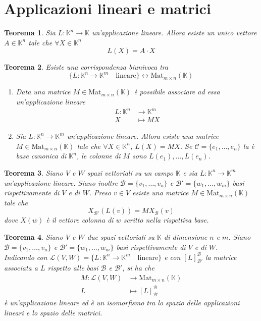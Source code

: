 \documentclass[9pt, a4paper]{article}
\newcommand{\K}{\mathbb{K}}
\theoremstyle{mythm}
\newtheorem{thm}{Teorema}[section]
\begin{document}
\clearpage

\section{Applicazioni lineari e matrici}

\begin{thm}
	Sia $ L \colon \K^n \to \K $ un'applicazione lineare. Allora esiste un unico vettore $ A \in \K^n $ tale che $ \forall X \in \K^n $ \[L(X) = A \cdot X\]
\end{thm}

\begin{thm}
	Esiste una corrispondenza biunivoca tra \[\{L \colon \K^n \to \K^m \quad \mathrm{lineare}\} \leftrightarrow \mathrm{Mat}_{m \times n}(\K)\]
	\begin{enumerate}
		\item Data una matrice $ M \in \mathrm{Mat}_{m \times n}(\K) $ è possibile associare ad essa un'applicazione lineare
		\begin{align*}
		L \colon \K^n & \to \K^m \\
		X & \mapsto MX
		\end{align*}
		\item Sia $ L \colon \K^n \to \K^m $ un'applicazione lineare. Allora esiste una matrice $ M \in \mathrm{Mat}_{m \times n}(\K) $ tale che $ \forall X \in \K^n $, $ L(X) = MX $. Se $ \mathscr{C} = \{e_1, \ldots , e_n\} $ la è base canonica di $ \K^n $, le colonne di $ M $ sono $ L(e_1), \ldots, L(e_n) $.
	\end{enumerate}
\end{thm}

\begin{thm}
	Siano $ V $ e $ W $ spazi vettoriali su un campo $ \K $ e sia $ L \colon \K^n \to \K^m $ un'applicazione lineare. Siano inoltre $ \mathscr{B} = \{v_1, \ldots, v_n\} $ e $ \mathscr{B}' = \{w_1, \ldots, w_m\} $ basi rispettivamente di $ V $ e di $ W $. Preso $ v \in V $ esiste una matrice $ M \in \mathrm{Mat}_{m \times n}(\K) $ tale che \[X_{\mathscr{B} '} (L(v)) = M X_{\mathscr{B}} (v) \] dove $ X(w) $ è il vettore colonna di $ w $ scritto nella rispettiva base. 
\end{thm}

\begin{thm}
	Siano $ V $ e $ W $ due spazi vettoriali su $ \K $ di dimensione $ n $ e $ m $. Siano $ \mathscr{B} = \{v_1, \ldots, v_n\} $ e $ \mathscr{B}' = \{w_1, \ldots, w_m\} $ basi rispettivamente di $ V $ e di $ W $. \\ Indicando con $ \mathscr{L}(V, W) = \{L \colon \K^n \to \K^m \quad \mathrm{lineare}\} $ e con $ \left [L \right ]_{\mathscr{B}'} ^{\mathscr{B}} $ la matrice associata a $ L $ rispetto alle basi $ \mathscr{B} $ e $ \mathscr{B}' $, si ha che 
	\begin{align*}
	M \colon \mathscr{L}(V, W) & \to \mathrm{Mat}_{m \times n}(\K)\\
	L & \mapsto \left [L \right ]_{\mathscr{B}'} ^{\mathscr{B}}
	\end{align*}
	è un'applicazione lineare ed è un isomorfismo tra lo spazio delle applicazioni lineari e lo spazio delle matrici. 
\end{thm}
\end{document}
